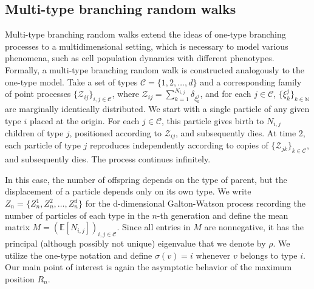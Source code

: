 \documentclass[12pt]{article}
\numberwithin{equation}{section}
\begin{document}
\subsection{Multi-type branching random walks}
 Multi-type branching random walks extend the ideas of one-type branching processes to a multidimensional setting, which is necessary to model various phenomena, such as cell population dynamics with different phenotypes. Formally, a multi-type branching random walk is constructed analogously to the one-type model. Take a set of types $\mathcal{C} = \{1, 2, \ldots, d\}$ and a corresponding family of point processes $\{\mathcal{Z}_{ij}\}_{i,j \in \mathcal{C}}$, where $\mathcal{Z}_{ij} = \sum_{k=1}^{N_{i,j}}\delta_{\xi^{j}_k}$, and for each $j \in \mathcal{C}$, $\{\xi_k^j\}_{k \in \mathbb{N}}$ are marginally identically distributed. We start with a single particle of any given type $i$ placed at the origin. For each $j \in \mathcal{C}$, this particle gives birth to $N_{i,j}$ children of type $j$, positioned according to $\mathcal{Z}_{ij}$, and subsequently dies. At time 2, each particle of type $j$ reproduces independently according to copies of $\{\mathcal{Z}_{jk}\}_{k \in \mathcal{C}}$, and subsequently dies. The process continues infinitely. 


In this case, the number of offspring depends on the type of parent, but the displacement of a particle depends only on its own type. We write $Z_n = \{Z^1_n, Z^2_n, \dots, Z^d_n\}$ for the d-dimensional Galton-Watson process recording the number of particles of each type in the $n$-th generation and define the mean matrix $M = (\mathbb{E}[N_{i,j}])_{i,j \in \mathcal{C}}$. Since all entries in $M$ are nonnegative, it has the principal (although possibly not unique) eigenvalue that we denote by $\rho$. We utilize the one-type notation and define $\sigma(v) = i$ whenever $v$ belongs to type $i$. Our main point of interest is again the asymptotic behavior of the maximum position $R_n$. 
\end{document}
